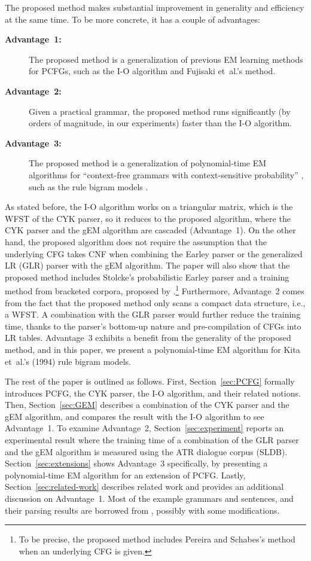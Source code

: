 \documentclass[english]{jnlp_1.4_rep}
\begin{document}
The proposed method makes substantial improvement in generality and
efficiency at the same time.  To be more concrete,
it has a couple of advantages:
\begin{description}
\item[\textbf{Advantage~1:}]
  The proposed method is a generalization of previous EM learning
  methods for PCFGs, such as the I-O algorithm and Fujisaki et~al.'s method.
\item[\textbf{Advantage~2:}]
  Given a practical grammar, the proposed method runs significantly
  (by orders of magnitude, in our experiments) faster than the I-O algorithm.
\item[\textbf{Advantage~3:}]
  The proposed method is a generalization of polynomial-time
  EM algorithms for
  ``context-free grammars with context-sensitive probability'' \cite{Magerman92},
  such as the rule bigram models \cite{Kita94}.
\end{description}
As stated before, the I-O algorithm works on a triangular
matrix, which is the WFST of the CYK parser, so it reduces to the
proposed algorithm, where the CYK parser and the gEM algorithm are
cascaded (Advantage~1).
On the other hand, the proposed algorithm does not require
the assumption that the underlying CFG takes CNF
when combining the Earley parser or the generalized LR (GLR) parser
\cite{Tomita91} with the gEM algorithm.
The paper will also show that the proposed method includes
Stolcke's probabilistic Earley parser \cite{Stolcke95}
and a training method from bracketed corpora,
proposed by .\footnote{
To be precise, the proposed method includes Pereira and Schabes's
method when an underlying CFG is given.
}
Furthermore, Advantage~2 comes from the fact that the proposed
method only scans a compact data structure, i.e., a WFST.  A combination
with the GLR parser would further reduce the training time, thanks to
the parser's bottom-up nature and pre-compilation of CFGs into LR tables.
Advantage~3 exhibits a benefit from the generality of
the proposed method, and in this paper, we present a polynomial-time
EM algorithm for Kita et~al.'s (1994) rule bigram models. \nocite{Kita94}

The rest of the paper is outlined as follows.  First, Section~\ref{sec:PCFG}
formally introduces PCFG, the CYK parser, the I-O algorithm, and their
related notions.  Then, Section~\ref{sec:GEM}
describes a combination of the CYK parser and the gEM algorithm,
and compares the result with the I-O algorithm to see Advantage~1.
To examine Advantage~2, Section~\ref{sec:experiment} reports
an experimental result where the training time of a combination of
the GLR parser and the gEM algorithm is measured using
the ATR dialogue corpus (SLDB).
Section~\ref{sec:extensions} shows Advantage~3 specifically,
by presenting a polynomial-time EM algorithm for an extension of PCFG.
Lastly, Section~\ref{sec:related-work} describes related work and
provides an additional discussion on Advantage~1.
Most of the example grammars and sentences, and their parsing results
are borrowed from \cite{Nagata99}, possibly with some modifications.
\end{document}
